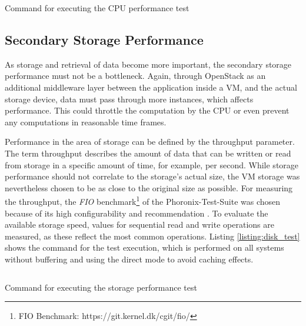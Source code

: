             \begin{listing}[ht]
                \inputminted[frame=single, linenos, breaklines]{bash}{measurements/00_install-execute/04_cpu.sh}
                \caption{Command for executing the CPU performance test}
                \label{listing:cpu_test}
            \end{listing}


        \subsection{Secondary Storage Performance}
        \label{subsection:methodology_storage}
            
            As storage and retrieval of data become more important, the secondary storage performance must not be a bottleneck.
            Again, through OpenStack as an additional middleware layer between the application inside a \ac{VM}, and the actual storage device, data must pass through more instances, which affects performance.
            This could throttle the computation by the \ac{CPU} or even prevent any computations in reasonable time frames. 
            
            \noindent Performance in the area of storage can be defined by the throughput parameter.
            The term throughput describes the amount of data that can be written or read from storage in a specific amount of time, for example, per second.
            While storage performance should not correlate to the storage's actual size, the \ac{VM} storage was nevertheless chosen to be as close to the original size as possible.
            For measuring the throughput, the \textsl{FIO} benchmark\footnote{FIO Benchmark: https://git.kernel.dk/cgit/fio/} of the Phoronix-Test-Suite was chosen because of its high configurability and recommendation \cite{OpenStackHTG2016}.
            To evaluate the available storage speed, values for sequential read and write operations are measured, as these reflect the most common operations.
            Listing \ref{listing:disk_test} shows the command for the test execution, which is performed on all systems without buffering and using the direct mode to avoid caching effects.
            
            \begin{listing}[ht]
                \inputminted[frame=single, linenos, breaklines]{bash}{measurements/00_install-execute/04_disk.sh}
                \caption{Command for executing the storage performance test}
                \label{listing:disk_test}
            \end{listing}


